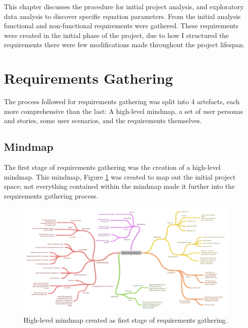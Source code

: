 \documentclass{l4proj}
\begin{document}
This chapter discusses the procedure for initial project analysis, and exploratory data analysis to discover specific equation parameters. From the initial analysis functional and non-functional requirements were gathered. These requirements were created in the initial phase of the project, due to how I structured the requirements there were few modifications made throughout the project lifespan.

\section{Requirements Gathering}

The process followed for requirements gathering was split into 4 artefacts, each more comprehensive than the last: A high-level mindmap, a set of user personas and stories, some user scenarios, and the requirements themselves.

\subsection{Mindmap}

The first stage of requirements gathering was the creation of a high-level mindmap. This mindmap, Figure \ref{fig:mindmap} was created to map out the initial project space; not everything contained within the mindmap made it further into the requirements gathering process.

\begin{figure}[!htb]
    \centering
    \includegraphics[width=1.0\linewidth]{images/mindmap.png}

    \caption{ High-level mindmap created as first stage of requirements gathering. }

    \label{fig:mindmap}
\end{figure}
\end{document}
